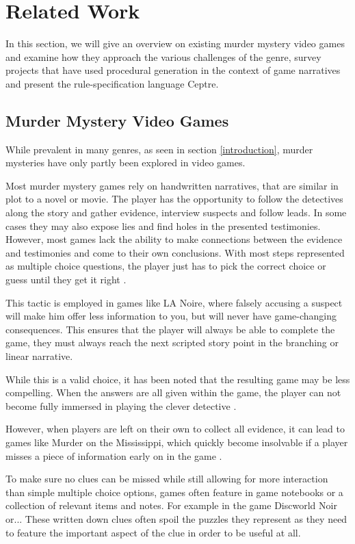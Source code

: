 \section{Related Work} \label{related_work}

In this section, we will give an overview on existing murder mystery video games and examine how they approach the various challenges of the genre, survey projects that have used procedural generation in the context of game narratives and present the rule-specification language Ceptre.

\subsection{Murder Mystery Video Games}

While prevalent in many genres, as seen in section \ref{introduction}, murder mysteries have only partly been explored in video games.

Most murder mystery games rely on handwritten narratives, that are similar in plot to a novel or movie.
The player has the opportunity to follow the detectives along the story and gather evidence, interview suspects and follow leads.
In some cases they may also expose lies and find holes in the presented testimonies.
However, most games lack the ability to make connections between the evidence and testimonies and come to their own conclusions. With most steps represented as multiple choice questions, the player just has to pick the correct choice or guess until they get it right \cite{brown_2017}. 

This tactic is employed in games like LA Noire, where falsely accusing a suspect will make him offer less information to you, but will never have game-changing consequences.
This ensures that the player will always be able to complete the game, they must always reach the next scripted story point in the branching or linear narrative.

While this is a valid choice, it has been noted that the resulting game may be less compelling.
When the answers are all given within the game, the player can not become fully immersed in playing the clever detective \cite{goldstein_2018}.

However, when players are left on their own to collect all evidence, it can lead to games like Murder on the Mississippi, which quickly become insolvable if a player misses a piece of information early on in the game \cite{petit_2018}.

To make sure no clues can be missed while still allowing for more interaction than simple multiple choice options, games often feature in game notebooks or a collection of relevant items and notes.
For example in the game Discworld Noir or...
These written down clues often spoil the puzzles they represent as they need to feature the important aspect of the clue in order to be useful at all.

